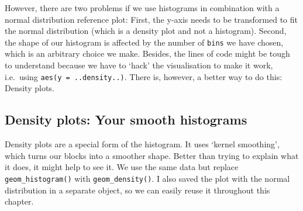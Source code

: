 \documentclass[
  letterpaper,
]{krantz}
\makeatletter
\newenvironment{Shaded}{\begin{snugshade}}{\end{snugshade}}
\newcommand{\AttributeTok}[1]{\textcolor[rgb]{0.40,0.45,0.13}{#1}}
\newcommand{\CommentTok}[1]{\textcolor[rgb]{0.37,0.37,0.37}{#1}}
\newcommand{\DecValTok}[1]{\textcolor[rgb]{0.68,0.00,0.00}{#1}}
\newcommand{\FunctionTok}[1]{\textcolor[rgb]{0.28,0.35,0.67}{#1}}
\newcommand{\NormalTok}[1]{\textcolor[rgb]{0.00,0.23,0.31}{#1}}
\newcommand{\OtherTok}[1]{\textcolor[rgb]{0.00,0.23,0.31}{#1}}
\newcommand{\SpecialCharTok}[1]{\textcolor[rgb]{0.37,0.37,0.37}{#1}}
\newcommand{\StringTok}[1]{\textcolor[rgb]{0.13,0.47,0.30}{#1}}
\newenvironment{kframe}{%
\medskip{}
\setlength{\fboxsep}{.8em}
 \def\at@end@of@kframe{}%
 \ifinner\ifhmode%
  \def\at@end@of@kframe{\end{minipage}}%
  \begin{minipage}{\columnwidth}%
 \fi\fi%
 \def\FrameCommand##1{\hskip\@totalleftmargin \hskip-\fboxsep
 \colorbox{shadecolor}{##1}\hskip-\fboxsep
     \hskip-\linewidth \hskip-\@totalleftmargin \hskip\columnwidth}%
 \MakeFramed {\advance\hsize-\width
   \@totalleftmargin\z@ \linewidth\hsize
   \@setminipage}}%
 {\par\unskip\endMakeFramed%
 \at@end@of@kframe}
\renewenvironment{Shaded}{\begin{kframe}}{\end{kframe}}
\makeatother
\begin{document}
However, there are two problems if we use histograms in combination with
a normal distribution reference plot: First, the y-axis needs to be
transformed to fit the normal distribution (which is a density plot and
not a histogram). Second, the shape of our histogram is affected by the
number of \texttt{bins} we have chosen, which is an arbitrary choice we
make. Besides, the lines of code might be tough to understand because we
have to `hack' the visualisation to make it work, i.e.~using
\texttt{aes(y\ =\ ..density..)}. There is, however, a better way to do
this: Density plots.

\subsection{Density plots: Your smooth
histograms}\label{density-plots-your-smooth-histograms}

Density plots are a special form of the histogram. It uses `kernel
smoothing', which turns our blocks into a smoother shape. Better than
trying to explain what it does, it might help to see it. We use the same
data but replace \texttt{geom\_histogram()} with
\texttt{geom\_density()}. I also saved the plot with the normal
distribution in a separate object, so we can easily reuse it throughout
this chapter.

\begin{Shaded}
\end{Shaded}
\end{document}
